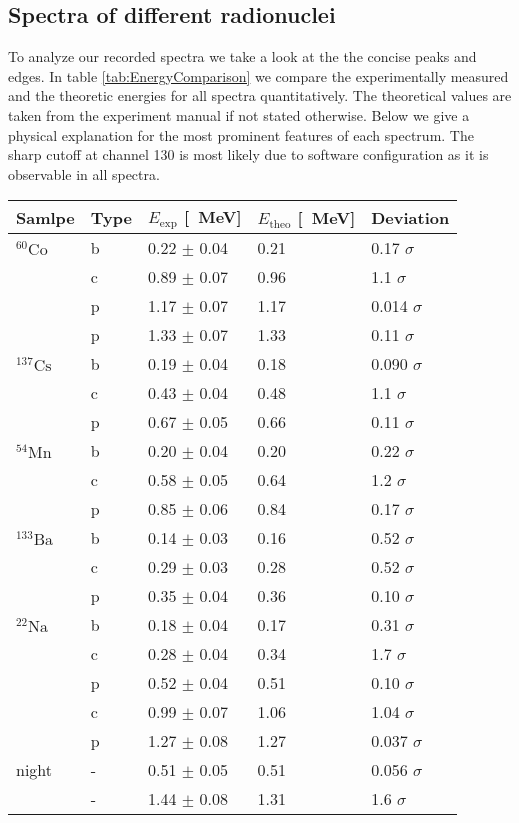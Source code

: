 \subsection{Spectra of different radionuclei}
%
To analyze our recorded spectra we take a look at the the concise peaks and edges.
In table \ref{tab:EnergyComparison} we compare the experimentally measured and the theoretic energies for all spectra quantitatively.
The theoretical values are taken from the experiment manual \cite{Anleitung} if not stated otherwise.
Below we give a physical explanation for the most prominent features of each spectrum.
The sharp cutoff at channel 130 is most likely due to software configuration as it is observable in all spectra.
%
\begin{multicolfloat}
\begin{center}
\begin{tabular}{lllll}
\toprule
Samlpe & Type & $E_{\text{exp}}$ [\SI{}{\mega\electronvolt}] & $E_{\text{theo}}$ [\SI{}{\mega\electronvolt}] & Deviation \\
\midrule
$^{60}\text{Co}$ & b & 0.22 $\pm$ 0.04 & 0.21 & 0.17 $\sigma$ \\
~ & c & 0.89 $\pm$ 0.07 & 0.96 & 1.1 $\sigma$ \\
~ & p & 1.17 $\pm$ 0.07 & 1.17 & 0.014 $\sigma$ \\
~ & p & 1.33 $\pm$ 0.07 & 1.33 & 0.11 $\sigma$ \\
%
$^{137}\text{Cs}$ & b & 0.19 $\pm$ 0.04 & 0.18 & 0.090 $\sigma$ \\
~ & c & 0.43 $\pm$ 0.04 & 0.48 & 1.1 $\sigma$ \\
~ & p & 0.67 $\pm$ 0.05 & 0.66 & 0.11 $\sigma$ \\
%
$^{54}\text{Mn}$ & b & 0.20 $\pm$ 0.04 & 0.20 & 0.22 $\sigma$ \\
~ & c & 0.58 $\pm$ 0.05 & 0.64 & 1.2 $\sigma$ \\
~ & p & 0.85 $\pm$ 0.06 & 0.84 & 0.17 $\sigma$ \\
%
$^{133}\text{Ba}$ & b & 0.14 $\pm$ 0.03 & 0.16 & 0.52 $\sigma$ \\
~ & c & 0.29 $\pm$ 0.03 & 0.28 & 0.52 $\sigma$ \\
~ & p & 0.35 $\pm$ 0.04  & 0.36 & 0.10 $\sigma$ \\
%
$^{22}\text{Na}$ & b & 0.18 $\pm$ 0.04 & 0.17 & 0.31 $\sigma$ \\
~ & c & 0.28 $\pm$ 0.04 & 0.34 & 1.7 $\sigma$ \\
~ & p & 0.52 $\pm$ 0.04 & 0.51 & 0.10 $\sigma$ \\
~ & c & 0.99 $\pm$ 0.07 & 1.06 & 1.04 $\sigma$ \\
~ & p & 1.27 $\pm$ 0.08 & 1.27 & 0.037 $\sigma$ \\
%
night & - & 0.51 $\pm$ 0.05 & 0.51 & 0.056 $\sigma$ \\
~ & - & 1.44 $\pm$ 0.08 & 1.31 & 1.6 $\sigma$ \\
\bottomrule
\end{tabular}
\label{tab:EnergyComparison}
\end{center}
\end{multicolfloat}
